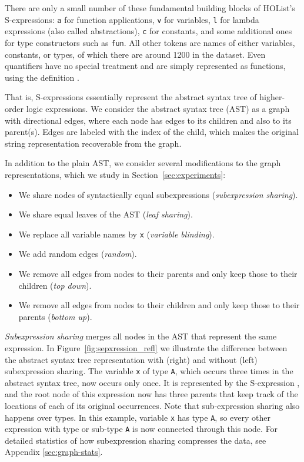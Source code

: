 \documentclass[letterpaper]{article} \usepackage{aaai20}  \usepackage{times}  \usepackage{helvet} \usepackage{courier}  \usepackage[hyphens]{url}  \usepackage{graphicx} \urlstyle{rm} \def\UrlFont{\rm}  \usepackage{graphicx}  \frenchspacing  \setlength{\pdfpagewidth}{8.5in}  \setlength{\pdfpageheight}{11in}
\begin{document}
There are only a small number of these fundamental building blocks of HOList's S-expressions: \texttt{a} for function applications, \texttt{v} for variables, \texttt{l} for lambda expressions (also called abstractions), \texttt{c} for constants, and some additional ones for type constructors such as \texttt{fun}.
All other tokens are names of either variables, constants, or types, of which there are around 1200 in the dataset.
Even quantifiers have no special treatment and are simply represented as functions, using the definition .

That is, S-expressions essentially represent the abstract syntax tree of higher-order logic expressions.
We consider the abstract syntax tree (AST) as a graph with directional edges, where each node has edges to its children and also to its parent(s).
Edges are labeled with the index of the child, which makes the original string representation recoverable from the graph.

In addition to the plain AST, we consider several modifications to the graph representations, which we study in Section~\ref{sec:experiments}:
\begin{itemize}
\item We share nodes of syntactically equal subexpressions (\emph{subexpression sharing}).
\item We share equal leaves of the AST (\emph{leaf sharing}).
\item We replace all variable names by \texttt{x} (\emph{variable blinding}).
\item We add random edges (\emph{random}).
\item We remove all edges from nodes to their parents and only keep those to their children (\emph{top down}).
\item We remove all edges from nodes to their children and only keep those to their parents (\emph{bottom up}).
\end{itemize}

\emph{Subexpression sharing} merges all nodes in the AST that represent the same expression.
In Figure~\ref{fig:sepxression_refl} we illustrate the difference between the abstract syntax tree representation with (right) and without (left) subexpression sharing.
The variable \texttt{x} of type \texttt{A}, which occurs three times in the abstract syntax tree, now occurs only once.
It is represented by the S-expression , and the root node of this expression now has three parents that keep track of the locations of each of its original occurrences.
Note that sub-expression sharing also happens over types.
In this example, variable \texttt{x} has type \texttt{A}, so every other expression with type or sub-type \texttt{A} is now connected through this node.
For detailed statistics of how subexpression sharing compresses the data, see Appendix \ref{sec:graph-stats}. 
\end{document}
